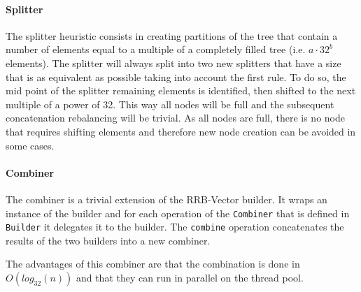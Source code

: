 \paragraph{Splitter}
The splitter heuristic consists in creating partitions of the tree that contain a number of elements equal to a multiple of a completely filled tree (i.e. $a \cdot 32^b$ elements). The splitter will always split into two new splitters that have a size that is as equivalent as possible taking into account the first rule. To do so, the mid point of the splitter remaining elements is identified, then shifted to the next multiple of a power of 32. This way all nodes will be full and the subsequent concatenation rebalancing will be trivial. As all nodes are full, there is no node that requires shifting elements and therefore new node creation can be avoided in some cases.

\paragraph{Combiner}
The combiner is a trivial extension of the RRB-Vector builder. It wraps an instance of the builder and for each operation of the \texttt{Combiner} that is defined in \texttt{Builder} it delegates it to the builder. The \texttt{combine} operation concatenates the results of the two builders into a new combiner.

The advantages of this combiner are that the combination is done in $O(log_{32}(n))$ and that they can run in parallel on the thread pool.

